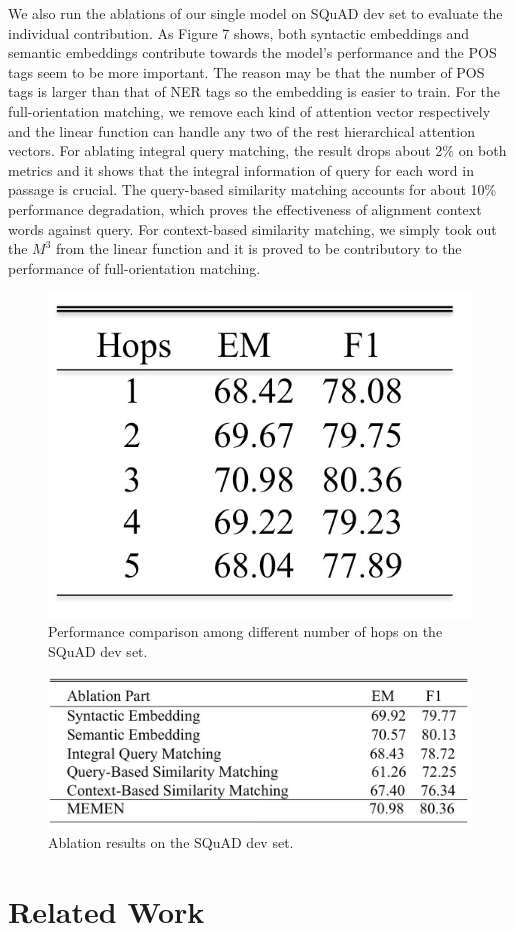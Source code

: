 \documentclass[letterpaper]{article}
\begin{document}
We also run the ablations of our single model on SQuAD dev set to evaluate the individual contribution. As Figure 7 shows, both syntactic embeddings and semantic embeddings contribute towards the model's performance and the POS tags seem to be more important. The reason may be that the number of POS tags is larger than that of NER tags so the embedding is easier to train. For the full-orientation matching, we remove each kind of attention vector respectively and the linear function can handle any two of the rest hierarchical attention vectors. For ablating integral query matching, the result drops about 2\% on both metrics and it shows that the integral information of query for each word in passage is crucial. The query-based similarity matching accounts for about 10\% performance degradation, which proves the effectiveness of alignment context words against query. For context-based similarity matching, we simply took out the 
$M^3$ from the linear function and it is proved to be contributory to the performance of full-orientation matching.



\begin{figure}[htbp]
  \begin{center}
  \includegraphics[width=0.24 \textwidth]{hops_squad.jpg}
  \caption{Performance comparison among different number of hops on the SQuAD dev set.}
  \end{center}
\end{figure}

\begin{figure}[htbp]
  \begin{center}
  \includegraphics[width=0.5 \textwidth]{ablation_squad.jpg}
  \caption{Ablation results on the SQuAD dev set.}
  \end{center}
\end{figure}



\section{Related Work}
\end{document}
